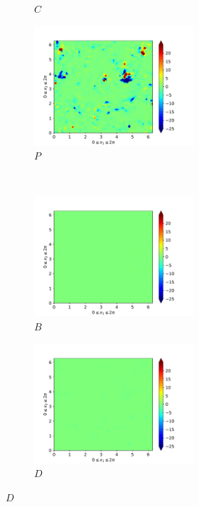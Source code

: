 \begin{figure}[H]
\begin{subfigure}{0.45\textwidth}
        \caption{$C$}
    \end{subfigure}
    \newline
    \begin{subfigure}{0.45\textwidth}
        \includegraphics[height=1.75in]{media/run-cds-65/P-ke-1420}
        \caption{$P$}
    \end{subfigure}
    ~
    \begin{subfigure}{0.45\textwidth}
        \includegraphics[height=1.75in]{media/run-cds-65/B-ke-1420}
        \caption{$B$}
    \end{subfigure}
    \newline
    \begin{subfigure}{0.45\textwidth}
        \includegraphics[height=1.75in]{media/run-cds-65/D-ke-1420}
        \caption{$D$}
    \end{subfigure}
\end{figure}

